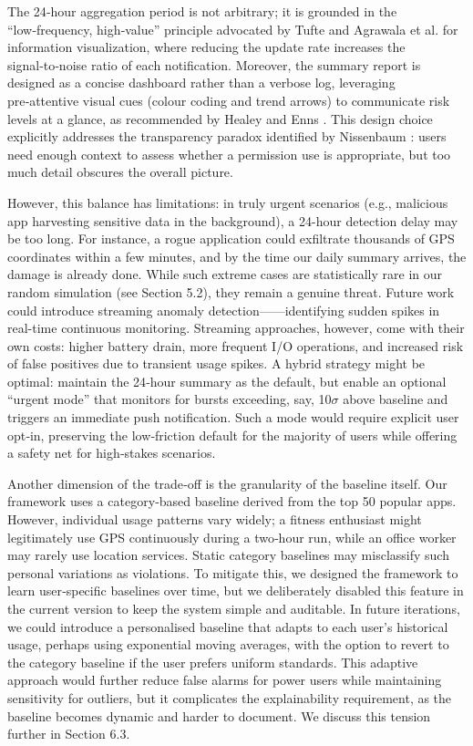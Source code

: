 The 24‑hour aggregation period is not arbitrary; it is grounded in the ``low‑frequency, high‑value'' principle advocated by Tufte \cite{28} and Agrawala et al. \cite{29} for information visualization, where reducing the update rate increases the signal‑to‑noise ratio of each notification. Moreover, the summary report is designed as a concise dashboard rather than a verbose log, leveraging pre‑attentive visual cues (colour coding and trend arrows) to communicate risk levels at a glance, as recommended by Healey and Enns \cite{31}. This design choice explicitly addresses the transparency paradox identified by Nissenbaum \cite{5}: users need enough context to assess whether a permission use is appropriate, but too much detail obscures the overall picture.

However, this balance has limitations: in truly urgent scenarios (e.g., malicious app harvesting sensitive data in the background), a 24-hour detection delay may be too long. For instance, a rogue application could exfiltrate thousands of GPS coordinates within a few minutes, and by the time our daily summary arrives, the damage is already done. While such extreme cases are statistically rare in our random simulation (see Section 5.2), they remain a genuine threat. Future work could introduce streaming anomaly detection——identifying sudden spikes in real-time continuous monitoring. Streaming approaches, however, come with their own costs: higher battery drain, more frequent I/O operations, and increased risk of false positives due to transient usage spikes. A hybrid strategy might be optimal: maintain the 24‑hour summary as the default, but enable an optional ``urgent mode'' that monitors for bursts exceeding, say, 10$\sigma$ above baseline and triggers an immediate push notification. Such a mode would require explicit user opt‑in, preserving the low‑friction default for the majority of users while offering a safety net for high‑stakes scenarios.

Another dimension of the trade‑off is the granularity of the baseline itself. Our framework uses a category‑based baseline derived from the top 50 popular apps. However, individual usage patterns vary widely; a fitness enthusiast might legitimately use GPS continuously during a two‑hour run, while an office worker may rarely use location services. Static category baselines may misclassify such personal variations as violations. To mitigate this, we designed the framework to learn user‑specific baselines over time, but we deliberately disabled this feature in the current version to keep the system simple and auditable. In future iterations, we could introduce a personalised baseline that adapts to each user's historical usage, perhaps using exponential moving averages, with the option to revert to the category baseline if the user prefers uniform standards. This adaptive approach would further reduce false alarms for power users while maintaining sensitivity for outliers, but it complicates the explainability requirement, as the baseline becomes dynamic and harder to document. We discuss this tension further in Section 6.3.

